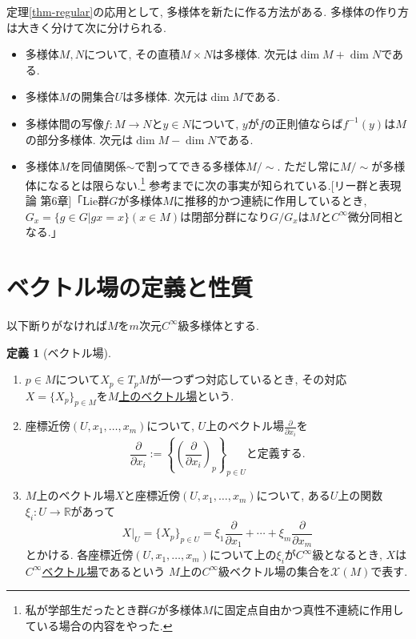 \documentclass[dvipdfmx,a4paper,11pt]{article}
\newcommand{\R}{\mathbb{R}}
\theoremstyle{definition}
\newtheorem{dfn}[thm]{定義}
\newcommand{\pdrv}[2]{\frac{\partial #1}{\partial #2}}
\begin{document}
定理\ref{thm-regular}の応用として, 多様体を新たに作る方法がある. 
多様体の作り方は大きく分けて次に分けられる.
\begin{itemize}
      \setlength{\parskip}{0cm}
  \setlength{\itemsep}{2pt} 
\item 多様体$M,N$について, その直積$M \times N$は多様体. 次元は$\dim M + \dim N$である. 
\item 多様体$M$の開集合$U$は多様体. 次元は$\dim M $である. 
\item 多様体間の写像$f : M \rightarrow N$と$y \in N$について, $y$が$f$の正則値ならば$f^{-1}(y)$は$M$の部分多様体. 次元は$\dim M - \dim N$である. 
\item 多様体$M$を同値関係$\sim$で割ってできる多様体$M/\sim$. ただし常に$M/\sim$が多様体になるとは限らない.\footnote{私が学部生だったとき群$G$が多様体$M$に固定点自由かつ真性不連続に作用している場合の内容をやった. } 
参考までに次の事実が知られている.[リー群と表現論 第6章]「Lie群$G$が多様体$M$に推移的かつ連続に作用しているとき, $G_{x} = \{g\in G| gx =x \}(x \in M)$は閉部分群になり$G/G_{x}$は$M$と$C^{\infty}$微分同相となる.」%
\end{itemize}


\section{ベクトル場の定義と性質}
以下断りがなければ$M$を$m$次元$C^\infty$級多様体とする.
\begin{tcolorbox}[
    colback = white,
    colframe = green!35!black,
    fonttitle = \bfseries,
    breakable = true]
    \begin{dfn}[ベクトル場]
 \text{}
    \begin{enumerate}
    \setlength{\parskip}{0cm}
  \setlength{\itemsep}{2pt} 
    \item $p \in M$について$X_{p} \in T_{p}M$が一つずつ対応しているとき, その対応$X = \{ X_p\}_{p \in M}$を\underline{$M$上のベクトル場}という.
    \item 座標近傍$(U, x_1, \ldots, x_m)$について, $U$上のベクトル場$\pdrv{}{x_i}$を
    $$\pdrv{}{x_i} := \left\{ \left( \pdrv{}{x_i} \right)_p \right\}_{p \in U} \text{と定義する.}$$
    \item $M$上のベクトル場$X$と座標近傍$(U, x_1, \ldots, x_m)$について, ある$U$上の関数$\xi_i : U \rightarrow \R$があって
    $$
   X|_{U}= \{ X_p\}_{p \in U} = \xi_1 \pdrv{}{x_1} + \cdots +\xi_m \pdrv{}{x_m}
    $$
    とかける. %
    各座標近傍$(U, x_1, \ldots, x_m)$について上の$\xi_i $が$C^{\infty}$級となるとき, $X$は\underline{$C^{\infty}$ベクトル場}であるという
    $M$上の$C^{\infty}$級ベクトル場の集合を$\mathscr{X}(M)$で表す. 
    \end{enumerate}
       \end{dfn}
    \end{tcolorbox}
    
\end{document}

